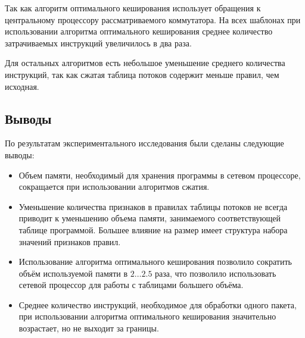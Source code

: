 \documentclass[oneside,final,12pt]{extarticle}
\begin{document}
        Так как алгоритм оптимального кеширования использует обращения к центральному процессору
        рассматриваемого коммутатора. На всех шаблонах при использовании алгоритма оптимального кеширования
        среднее количество затрачиваемых инструкций увеличилось в два раза.

        Для остальных алгоритмов есть небольшое уменьшение среднего количества инструкций,
        так как сжатая таблица потоков содержит меньше правил, чем исходная.
        \subsection{Выводы}
            По результатам экспериментального исследования были сделаны следующие выводы:
            \begin{itemize}
                \item Объем памяти, необходимый для хранения программы в сетевом процессоре, 
                    сокращается при использовании алгоритмов сжатия.
                \item Уменьшение количества признаков в правилах таблицы потоков не всегда 
                    приводит к уменьшению объема памяти, занимаемого соответствующей таблице 
                    программой. Большее влияние на размер имеет структура набора значений 
                    признаков правил.
                \item Использование алгоритма оптимального кеширования позволило сократить объём используемой памяти в 
                    \(2\ldots2.5\) раза, что позволило использовать сетевой процессор для работы с 
                    таблицами большего объёма.
                \item Среднее количество инструкций, необходимое для обработки одного пакета,
                    при использовании алгоритма оптимального кеширования значительно возрастает, но не выходит за границы.
            \end{itemize}
            \clearpage
\end{document}
